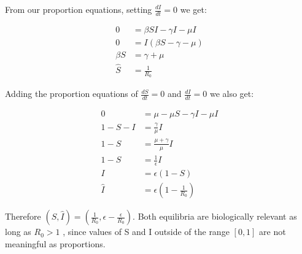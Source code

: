 From our proportion equations, setting $\frac{dI}{dt} = 0$ we get:

\begin{align*}
    0 &= \beta SI - \gamma I - \mu I \\
    0 &= I (\beta S - \gamma - \mu ) \\
    \beta S &=  \gamma + \mu \\
    \hat{S} &= \frac{1}{R_{0}}
\end{align*}

Adding the proportion equations of $\frac{dS}{dt} = 0$ and $\frac{dI}{dt} = 0$ we also get:

\begin{align*}
    0 &= \mu - \mu S - \gamma I - \mu I \\
    1 - S - I &= \frac{\gamma}{\mu} I \\
    1 - S &= \frac{\mu + \gamma}{\mu} I \\
    1 - S &= \frac{1}{\epsilon} I \\
    I &= \epsilon (1 - S) \\
    \hat{I} &= \epsilon (1 - \frac{1}{R_{0}})
\end{align*}

Therefore $(\hat{S}, \hat{I}) = (\frac{1}{R_{0}}, \epsilon - \frac{\epsilon}{{R_{0}}})$. Both equilibria are biologically relevant as long as $R_{0} > 1$ , since values of S and I outside of the range $[0,1]$ are not meaningful as proportions.
